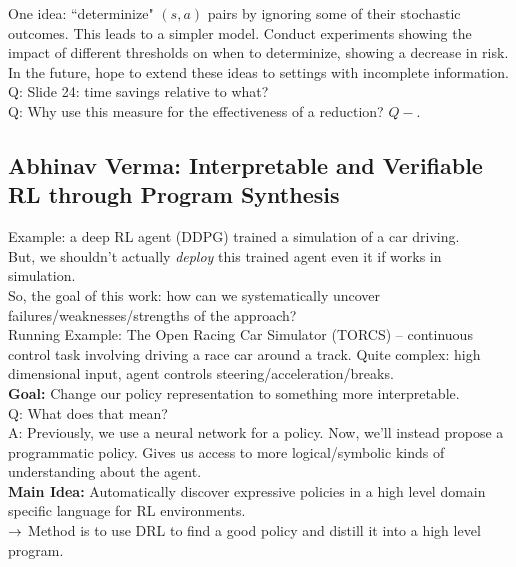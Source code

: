 One idea: ``determinize" $(s,a)$ pairs by ignoring some of their stochastic outcomes. This leads to a simpler model. Conduct experiments showing the impact of different thresholds on when to determinize, showing a decrease in risk. \\

In the future, hope to extend these ideas to settings with incomplete information. \\

Q: Slide 24: time savings relative to what? \\

Q: Why use this measure for the effectiveness of a reduction? $Q - $.

\spacerule
\subsection{Abhinav Verma: Interpretable and Verifiable RL through Program Synthesis}

Example: a deep RL agent (DDPG) trained a simulation of a car driving. \\

But, we shouldn't actually {\it deploy} this trained agent even it if works in simulation. \\

So, the goal of this work: how can we systematically uncover failures/weaknesses/strengths of the approach? \\

Running Example: The Open Racing Car Simulator (TORCS) -- continuous control task involving driving a race car around a track. Quite complex: high dimensional input, agent controls steering/acceleration/breaks. \\

{\bf Goal:} Change our policy representation to something more interpretable. \\

Q: What does that mean? \\

A: Previously, we use a neural network for a policy. Now, we'll instead propose a programmatic policy. Gives us access to more logical/symbolic kinds of understanding about the agent. \\

{\bf Main Idea:} Automatically discover expressive policies in a high level domain specific language for RL environments. \\

$\rightarrow$ Method is to use DRL to find a good policy and distill it into a high level program. \\


